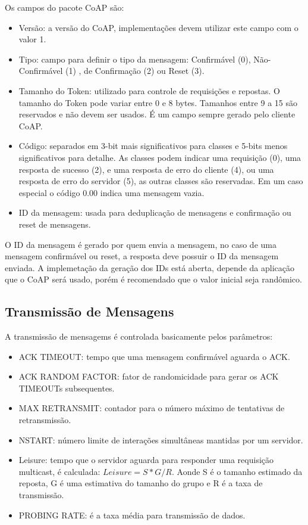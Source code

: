Os campos do pacote CoAP s\~ao:
\begin{itemize}
    \item Vers\~ao: a vers\~ao do CoAP, implementa\c{c}\~oes devem utilizar este campo com o valor 1.
    \item Tipo: campo para definir o tipo da mensagem: Confirm\'avel (0), N\~ao-Confirm\'avel (1) , de Confirma\c{c}\~ao (2) ou Reset (3).
    \item Tamanho do Token: utilizado para controle de requisi\c{c}\~oes e repostas. O tamanho do Token pode variar entre 0 e 8 bytes. Tamanhos entre 9 a 15 s\~ao reservados e n\~ao devem ser usados. \'E um campo sempre gerado pelo cliente CoAP.
    \item C\'odigo: separados em 3-bit mais significativos para classes e 5-bits menos significativos para detalhe. As classes podem indicar uma requisi\c{c}\~ao (0), uma resposta de sucesso (2), e uma resposta de erro do cliente (4), ou uma resposta de erro do servidor (5), as outras classes s\~ao reservadas. Em um caso especial o c\'odigo 0.00 indica uma mensagem vazia.
    \item ID da mensagem: usada para deduplica\c{c}\~ao de mensagens e confirma\c{c}\~ao ou reset de mensagens.
\end{itemize}

O ID da mensagem \'e gerado por quem envia a mensagem, no caso de uma mensagem confirm\'avel ou reset, a resposta deve possuir o ID da mensagem enviada. A implemeta\c{c}\~ao da gera\c{c}\~ao dos IDs est\'a aberta, depende da aplica\c{c}\~ao que o CoAP ser\'a usado, por\'em \'e recomendado que o valor inicial seja rand\^omico.
   
\subsection{Transmiss\~ao de Mensagens}
A transmiss\~ao de mensagems \'e controlada basicamente pelos par\^ametros:

\begin{itemize}
    \item ACK TIMEOUT: tempo que uma mensagem confirm\'avel aguarda o ACK.
    \item ACK RANDOM FACTOR: fator de randomicidade para gerar os ACK TIMEOUTs subsequentes.
    \item MAX RETRANSMIT: contador para o n\'umero m\'aximo de tentativas de retransmiss\~ao.
    \item NSTART: n\'umero limite de intera\c{c}\~oes simult\^aneas mantidas por um servidor.
    \item Leisure: tempo que o servidor aguarda para responder uma requisi\c{c}\~ao multicast, \'e calculada: \begin{math}Leisure = S * G / R\end{math}. Aonde S \'e o tamanho estimado da reposta, G \'e uma estimativa do tamanho do grupo e R \'e a taxa de transmiss\~ao.
    \item PROBING RATE: \'e a taxa m\'edia para transmiss\~ao de dados.
\end{itemize}

